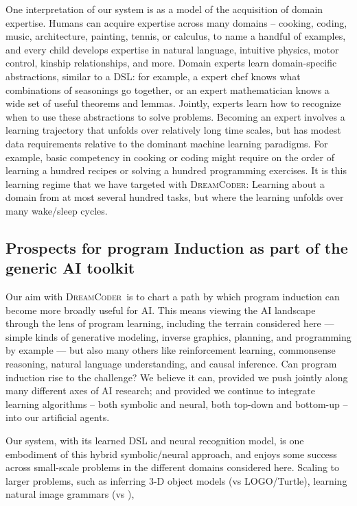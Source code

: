 \documentclass{article}
\newcommand{\system}{\textsc{DreamCoder}~}
\newcommand{\systemEnding}{\textsc{DreamCoder}}
\begin{document}
One interpretation of our system is as a model of the acquisition of
domain expertise. Humans can acquire expertise across many domains --
cooking, coding, music, architecture, painting, tennis, or calculus,
to name a handful of examples, and every child develops expertise in
natural language, intuitive physics, motor control, kinship
relationships, and more. Domain experts learn domain-specific
abstractions, similar to a DSL: for example, a expert chef knows what
combinations of seasonings go together, or an expert mathematician
knows a wide set of useful theorems and lemmas.  Jointly, experts
learn how to recognize when to use these abstractions to solve
problems.  Becoming an expert involves a learning trajectory that
unfolds over relatively long time scales, but has modest data
requirements relative to the dominant machine learning paradigms. For
example, basic competency in cooking or coding might require on the
order of learning a hundred recipes or solving a hundred programming
exercises.  It is this learning regime that we have targeted with
\systemEnding: Learning about a domain from at most several hundred
tasks, but where the learning unfolds over many wake/sleep cycles.



\subsection{Prospects for program Induction as part of the generic AI toolkit}

Our aim with \system is to chart a path by which program induction can
become more broadly useful for AI.  This means viewing the AI
landscape through the lens of program learning, including the terrain
considered here --- simple kinds of generative modeling, inverse
graphics, planning, and programming by example --- but also many
others like reinforcement learning, commonsense reasoning, natural
language understanding, and causal inference. Can program induction
rise to the challenge?  We believe it can, provided we push jointly
along  many different axes of AI research; and provided we continue
to integrate learning algorithms -- both symbolic and neural, both
top-down and bottom-up -- into our artificial agents.

Our system, with its learned DSL and neural recognition model, is one
embodiment of this hybrid symbolic/neural approach, and enjoys some
success across small-scale problems in the different domains considered
here. Scaling to larger problems,
such as inferring 3-D object models (vs LOGO/Turtle),
learning natural image grammars (vs ),
\end{document}

